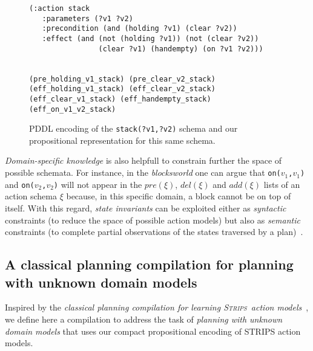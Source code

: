 \documentclass[letterpaper]{article} %
\newcommand{\strips}{\textsc{Strips}}     %
\begin{document}
\begin{figure}
  \begin{tiny}  
  \begin{verbatim}
(:action stack
   :parameters (?v1 ?v2)
   :precondition (and (holding ?v1) (clear ?v2))
   :effect (and (not (holding ?v1)) (not (clear ?v2))
                (clear ?v1) (handempty) (on ?v1 ?v2)))


(pre_holding_v1_stack) (pre_clear_v2_stack)
(eff_holding_v1_stack) (eff_clear_v2_stack)
(eff_clear_v1_stack) (eff_handempty_stack) (eff_on_v1_v2_stack)
  \end{verbatim}           
  \end{tiny}  
 \caption{\small PDDL encoding of the {\tt\small stack(?v1,?v2)} schema and our propositional representation for this same schema.}
\label{fig:propositional}
\end{figure}

{\em Domain-specific knowledge} is also helpfull to constrain further the space of possible schemata. For instance, in the {\em blocksworld} one can argue that {\small\tt on($v_1$,$v_1$)} and {\small\tt on($v_2$,$v_2$)} will not appear in the $pre(\xi)$, $del(\xi)$ and $add(\xi)$ lists of an action schema $\xi$ because, in this specific domain, a block cannot be on top of itself. With this regard, {\it state invariants} can be exploited either as {\em syntactic} constraints (to reduce the space of possible action models) but also as {\em semantic} constraints (to complete partial observations of the states traversed by a plan)~\cite{fox:TIM:JAIR1998}. 

\subsection{A classical planning compilation for planning with unknown domain models}
Inspired by the {\em classical planning compilation for learning \strips\ action models}~\cite{aineto2018learning}, we define here a compilation to address the task of {\em planning with unknown domain models} that uses our compact propositional encoding of STRIPS action models.
\end{document}

